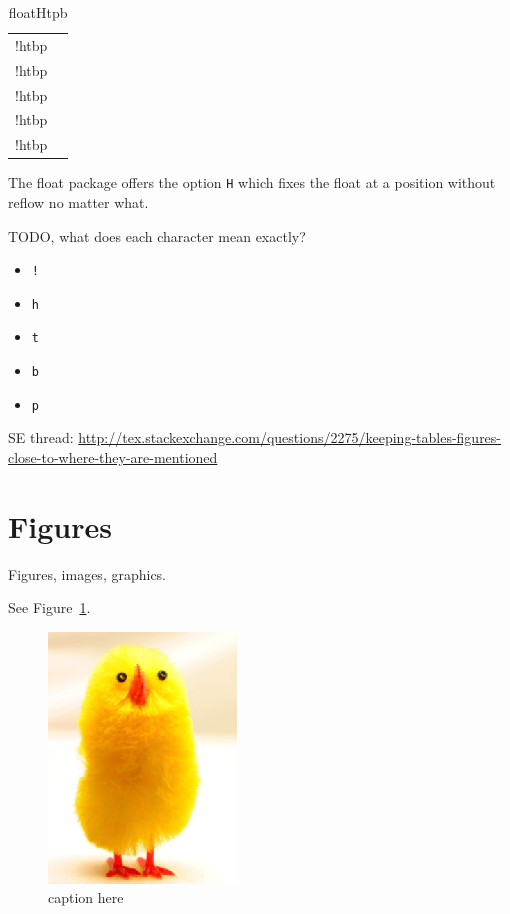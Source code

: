 \documentclass[12pt]{article}
\begin{document}
  \begin{table}
    \begin{tabular}{cc}
      !htbp \\ !htbp \\ !htbp \\ !htbp \\ !htbp \\
    \end{tabular}
    \caption{floatHtpb}
    \label{floatHtpb}
  \end{table}

  The float package offers the option \lstinline|H| which fixes the float at a position without reflow no matter what.

  TODO, what does each character mean exactly?

  \begin{itemize}
    \item \lstinline|!|
    \item \lstinline|h|
    \item \lstinline|t|
    \item \lstinline|b|
    \item \lstinline|p|
  \end{itemize}

  SE thread: \url{http://tex.stackexchange.com/questions/2275/keeping-tables-figures-close-to-where-they-are-mentioned}

\section{Figures}\label{figures}

  Figures, images, graphics.

  See Figure~\ref{fig-label}.

  \begin{figure}[htb]
    \includegraphics[width=5cm]{image.png}
    \caption{caption here}
    \label{fig-label}
  \end{figure}
\end{document}
